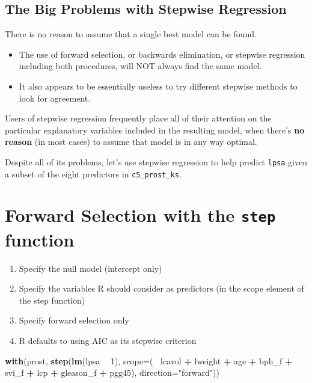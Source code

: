 \documentclass[]{book}
\newenvironment{Shaded}{\begin{snugshade}}{\end{snugshade}}
\newcommand{\KeywordTok}[1]{\textcolor[rgb]{0.13,0.29,0.53}{\textbf{#1}}}
\newcommand{\DataTypeTok}[1]{\textcolor[rgb]{0.13,0.29,0.53}{#1}}
\newcommand{\DecValTok}[1]{\textcolor[rgb]{0.00,0.00,0.81}{#1}}
\newcommand{\StringTok}[1]{\textcolor[rgb]{0.31,0.60,0.02}{#1}}
\newcommand{\OperatorTok}[1]{\textcolor[rgb]{0.81,0.36,0.00}{\textbf{#1}}}
\newcommand{\NormalTok}[1]{#1}
\providecommand{\tightlist}{%
  \setlength{\itemsep}{0pt}\setlength{\parskip}{0pt}}
\theoremstyle{definition}
\theoremstyle{definition}
\theoremstyle{definition}
\theoremstyle{remark}
\begin{document}
\subsection{The Big Problems with Stepwise
Regression}\label{the-big-problems-with-stepwise-regression}

There is no reason to assume that a single best model can be found.

\begin{itemize}
\tightlist
\item
  The use of forward selection, or backwards elimination, or stepwise
  regression including both procedures, will NOT always find the same
  model.
\item
  It also appears to be essentially useless to try different stepwise
  methods to look for agreement.
\end{itemize}

Users of stepwise regression frequently place all of their attention on
the particular explanatory variables included in the resulting model,
when there's \textbf{no reason} (in most cases) to assume that model is
in any way optimal.

Despite all of its problems, let's use stepwise regression to help
predict \texttt{lpsa} given a subset of the eight predictors in
\texttt{c5\_prost\_ks}.

\section{\texorpdfstring{Forward Selection with the \texttt{step}
function}{Forward Selection with the step function}}\label{forward-selection-with-the-step-function}

\begin{enumerate}
\def\labelenumi{\arabic{enumi}.}
\tightlist
\item
  Specify the null model (intercept only)
\item
  Specify the variables R should consider as predictors (in the scope
  element of the step function)
\item
  Specify forward selection only
\item
  R defaults to using AIC as its stepwise criterion
\end{enumerate}

\begin{Shaded}
\begin{Highlighting}[]
\KeywordTok{with}\NormalTok{(prost, }
     \KeywordTok{step}\NormalTok{(}\KeywordTok{lm}\NormalTok{(lpsa }\OperatorTok{~}\StringTok{ }\DecValTok{1}\NormalTok{), }
     \DataTypeTok{scope=}\NormalTok{(}\OperatorTok{~}\StringTok{ }\NormalTok{lcavol }\OperatorTok{+}\StringTok{ }\NormalTok{lweight }\OperatorTok{+}\StringTok{ }\NormalTok{age }\OperatorTok{+}\StringTok{ }\NormalTok{bph_f }\OperatorTok{+}\StringTok{ }\NormalTok{svi_f }\OperatorTok{+}\StringTok{ }
\StringTok{                }\NormalTok{lcp }\OperatorTok{+}\StringTok{ }\NormalTok{gleason_f }\OperatorTok{+}\StringTok{ }\NormalTok{pgg45), }
     \DataTypeTok{direction=}\StringTok{"forward"}\NormalTok{))}
\end{Highlighting}
\end{Shaded}
\end{document}
